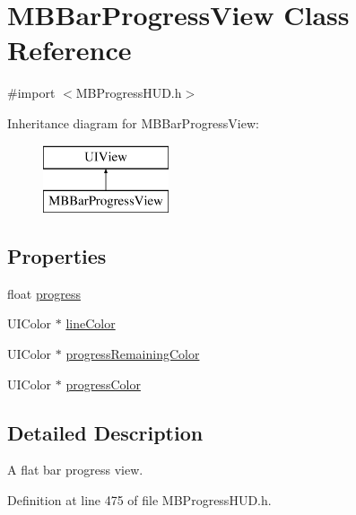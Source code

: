 \hypertarget{interface_m_b_bar_progress_view}{\section{M\+B\+Bar\+Progress\+View Class Reference}
\label{interface_m_b_bar_progress_view}
}


{\ttfamily \#import $<$M\+B\+Progress\+H\+U\+D.\+h$>$}

Inheritance diagram for M\+B\+Bar\+Progress\+View\+:\begin{figure}[H]
\begin{center}
\leavevmode
\includegraphics[height=2.000000cm]{interface_m_b_bar_progress_view}
\end{center}
\end{figure}
\subsection*{Properties}
\begin{DoxyCompactItemize}
\item 
float \hyperlink{interface_m_b_bar_progress_view_aa34865ca266850eb7060e91309f3512b}{progress}
\item 
U\+I\+Color $\ast$ \hyperlink{interface_m_b_bar_progress_view_a594029fb5ed62f3de81902c0ea815f2f}{line\+Color}
\item 
U\+I\+Color $\ast$ \hyperlink{interface_m_b_bar_progress_view_a0529e715ce6e40bf0e09864ba0ca1219}{progress\+Remaining\+Color}
\item 
U\+I\+Color $\ast$ \hyperlink{interface_m_b_bar_progress_view_a5b27bb23bd54ae1c7b37a3fedd817e80}{progress\+Color}
\end{DoxyCompactItemize}


\subsection{Detailed Description}
A flat bar progress view. 

Definition at line 475 of file M\+B\+Progress\+H\+U\+D.\+h.



